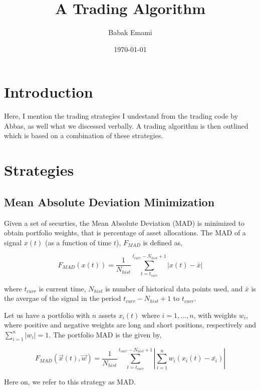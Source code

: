 \documentclass{article}
\title{A Trading Algorithm}
\author{Babak Emami}
\date{\today}
\begin{document}
\maketitle

\section{Introduction}\label{introduction}

Here, I mention the trading strategies I undestand from the trading
code by Abbas, as well what we discessed verbally. A trading algorithm
is then outlined which is based on a combination of these strategies.

\section{Strategies}\label{section:abbas-strategies}

\subsection{Mean Absolute Deviation Minimization}\label{section:mad}

Given a set of securties, the Mean Absolute Deviation (MAD) is
minimized to obtain portfolio weights, that is percentage of asset
allocations. The MAD of a signal $x(t)$ (as a function
of time $t$), $F_{MAD}$ is defined as,

\begin{equation}\label{eqn:mad}
F_{MAD}(x(t)) = \frac{1}{N_{hist}}\sum_{t=t_{curr}}^{t_{curr}-N_{hist}+1} |x(t)-\bar{x}|
\end{equation}

where $t_{curr}$ is current time, $N_{hist}$ is number of historical
data points used, and $\bar{x}$ is the avergae of the signal in the
period $t_{curr}-N_{hist}+1$ to $t_{curr}$.

Let us have a portfolio with $n$ assets $x_{i}(t)$ where $i = 1,
...,n$, with weights $w_{i}$, where positive and negative weights are
long and short positions, respectively and $\sum_{i=1}^{n} |w_{i}|
= 1$. The portfolio MAD is the given by,

\begin{equation}\label{eqn:mad}
F_{MAD}(\vec{x}(t),\vec{w}) = \frac{1}{N_{hist}}\sum_{t=t_{curr}}^{t_{curr}-N_{hist}+1}
|\sum_{i=1}^{n} w_{i} (x_{i}(t)-\bar{x_{i}})|
\end{equation}

Here on, we refer to this strategy as MAD.
\end{document}
